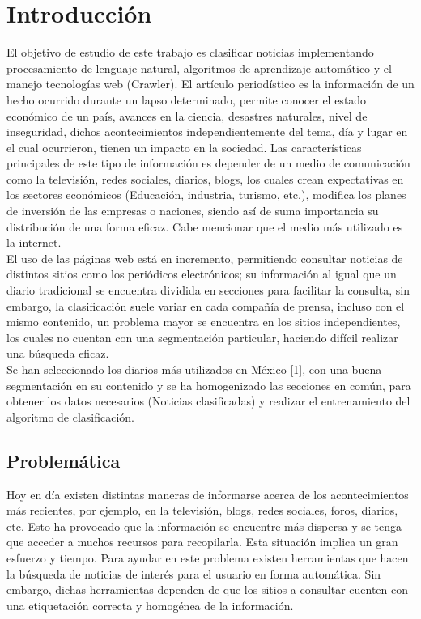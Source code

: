 
\chapter{Introducción}\label{chp:introduccion}

El objetivo de estudio de este trabajo es clasificar noticias implementando procesamiento de lenguaje natural, algoritmos de aprendizaje automático y el manejo tecnologías web (Crawler). El artículo periodístico es la información de un hecho ocurrido durante un lapso determinado, permite conocer el estado económico de un país, avances en la ciencia, desastres naturales, nivel de inseguridad, dichos acontecimientos independientemente del tema, día y lugar en el cual ocurrieron, tienen un impacto en la sociedad. Las características principales de este tipo de información es depender de un medio de comunicación como la televisión, redes sociales, diarios, blogs, los cuales crean expectativas en los sectores económicos (Educación, industria, turismo, etc.), modifica los planes de inversión de las empresas o naciones, siendo así de suma importancia su distribución de una forma eficaz. Cabe mencionar que el medio más utilizado es la internet.\\

El uso de las páginas web está en incremento, permitiendo consultar noticias de distintos sitios como los periódicos electrónicos; su información al igual que un diario tradicional se encuentra dividida en secciones para facilitar la consulta, sin embargo, la clasificación suele variar en cada compañía de prensa, incluso con el mismo contenido, un problema mayor se encuentra en los sitios independientes, los cuales no cuentan con una segmentación particular, haciendo difícil realizar una búsqueda eficaz.\\

Se han seleccionado los diarios más utilizados en México [1], con una buena segmentación en su contenido y se ha homogenizado las secciones en común, para obtener los datos necesarios (Noticias clasificadas) y realizar el entrenamiento del algoritmo de clasificación.



\section{Problemática}

Hoy en día existen distintas maneras de informarse acerca de los acontecimientos más recientes, por ejemplo, en la televisión, blogs, redes sociales, foros, diarios, etc. Esto ha provocado que la información se encuentre más dispersa y se tenga que acceder a muchos recursos para recopilarla. Esta situación implica un gran esfuerzo y tiempo. Para ayudar en este problema existen herramientas que hacen la búsqueda de noticias de interés para el usuario en forma automática. Sin embargo, dichas herramientas dependen de que los sitios a consultar cuenten con una etiquetación correcta y homogénea de la información.\\

